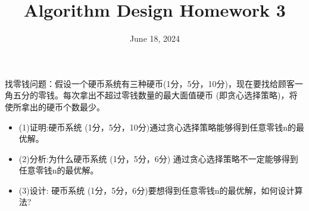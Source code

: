 \documentclass[12pt]{article}
\title{\textbf{Algorithm Design Homework 3}}
\date{June 18, 2024}
\begin{document}
\maketitle

\begin{question}{}{}
找零钱问题：假设一个硬币系统有三种硬币(1分，5分，10分)，现在要找给顾客一角五分的零钱。每次拿出不超过零钱数量的最大面值硬币 (即贪心选择策略)，将使所拿出的硬币个数最少。
\begin{itemize}
  \item (1)证明:硬币系统 (1分，5分，10分)通过贪心选择策略能够得到任意零钱n的最优解。
  \item (2)分析:为什么硬币系统 (1分，5分，6分) 通过贪心选择策略不一定能够得到任意零钱n的最优解。
  \item (3)设计: 硬币系统 (1分，5分，6分)要想得到任意零钱n的最优解，如何设计算法?
\end{itemize}
\end{question}
\end{document}
